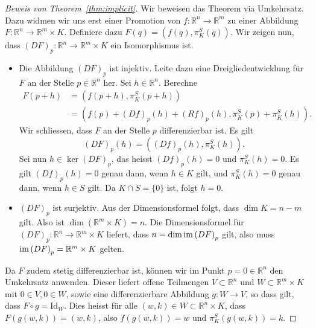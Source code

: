 \documentclass[../main.tex]{subfiles}
\begin{document}
\begin{proof}[Beweis von Theorem~\ref{thm:implicit}]
  Wir beweisen das Theorem via Umkehrsatz.
  Dazu widmen wir uns erst einer Promotion
  von $f \colon \mathbb{R}^n \to \mathbb{R}^m$
  zu einer Abbildung
  $F \colon \mathbb{R}^n \to \mathbb{R}^m \times K$.
  Definiere dazu $F(q) = (f(q), \pi_K^S(q))$.
  Wir zeigen nun, dass ${(DF)}_p \colon \mathbb{R}^n \to
  \mathbb{R}^m \times K$
  ein Isomorphismus ist.
  \begin{itemize}
    \item Die Abbildung ${(DF)}_p$
      ist injektiv.
      Leite dazu eine Dreigliedentwicklung für $F$ an
      der Stelle $p \in \mathbb{R}^n$ her.
      Sei $h \in \mathbb{R}^n$.
      Berechne
      \begin{align*}
        F(p+h)
        & = (f(p + h), \pi_K^S(p + h)) \\
        &= (f(p) + {(Df)}_p(h) + {(Rf)}_p(h), \pi_K^S(p) + \pi_K^S(h)).
      \end{align*}
      Wir schliessen, dass $F$
      an der Stelle  $p$ differenzierbar ist.
      Es gilt \[{(DF)}_p(h) = ({(Df)}_p(h), \pi_K^S(h)).\]
      Sei nun $h \in \ker {(DF)}_p$, das heisst
      ${(Df)}_p(h) = 0$ und $\pi_K^S(h) = 0$.
      Es gilt ${(Df)}_p(h) = 0$ genau dann,
      wenn $h \in K$ gilt, und $\pi_K^S(h) = 0$ genau dann,
      wenn $h \in S$ gilt. Da $K \cap S = \{0\}$ ist, folgt $h = 0$.
    \item ${(DF)}_p$ ist surjektiv.
      Aus der Dimensionsformel folgt, dass $\dim K = n - m$ gilt.
      Also ist $\dim (\mathbb{R}^m \times K) = n$.
      Die Dimensionsformel für
      ${(DF)}_p \colon \mathbb{R}^n \to \mathbb{R}^m \times K$
      liefert, dass $n = \dim \operatorname{im} {(DF)}_p$ gilt, also muss
      $\operatorname{im} {(DF)}_p = \mathbb{R}^m \times K$ gelten.
  \end{itemize}
  Da $F$ zudem stetig differenzierbar ist,
  können wir im Punkt $p = 0 \in \mathbb{R}^n$ den Umkehrsatz anwenden.
  Dieser liefert offene Teilmengen
  $V \subset \mathbb{R}^n$ und $W \subset \mathbb{R}^m \times K$
  mit $0 \in V, 0 \in W$,
  sowie eine differenzierbare Abbildung $g \colon W \to V$,
  so dass gilt, dass $F \circ g = \text{Id}_W$.
  Dies heisst für alle $(w, k) \in W \subset \mathbb{R}^n \times K$,
  dass $F(g(w, k)) = (w, k)$, also
  $f(g(w, k)) = w$
  und $\pi_K^S(g(w, k)) = k$.


\end{proof}
\end{document}
